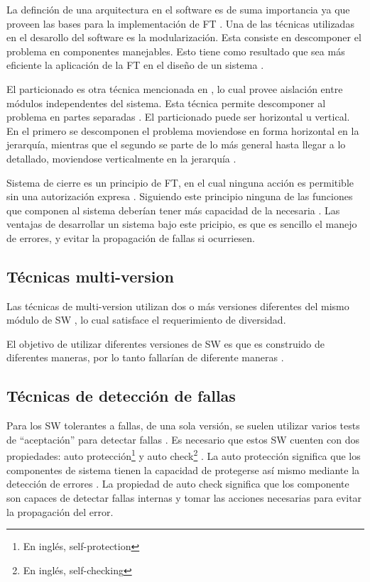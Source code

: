 La definción de una arquitectura en el software es de suma importancia ya que proveen las bases para 
la implementación de \ac{FT} \citep{SoftwareFaultToleranceATutorial}. Una de las técnicas utilizadas 
en el desarollo del software es la modularización. Esta consiste en descomponer el problema en 
componentes manejables. Esto tiene como resultado que sea más eficiente la aplicación de la \ac{FT} 
en el diseño de un sistema \citep{SoftwareFaultToleranceATutorial}. 

El particionado es otra técnica mencionada en \cite{SoftwareFaultToleranceATutorial}, lo cual 
provee aislación entre módulos independentes del sistema. Esta técnica permite descomponer al 
problema en partes separadas \citep{pressman01}. El particionado puede ser horizontal u 
vertical. En el primero se descomponen el problema moviendose en forma horizontal en la jerarquía, 
mientras que el segundo se parte de lo más general hasta llegar a lo detallado, moviendose 
verticalmente en la jerarquía \citep{pressman01}. 

Sistema de cierre es un principio de \ac{FT}, en el cual ninguna acción es permitible sin una 
autorización expresa \citep{SoftwareFaultToleranceATutorial}. Siguiendo este principio ninguna de 
las funciones que componen al sistema deberían tener más capacidad de la necesaria 
\citep{SoftwareFaultToleranceATutorial}. Las ventajas de desarrollar un sistema bajo este pricipio, 
es que es sencillo el manejo de errores, y evitar la propagación de fallas si ocurriesen. 

\subsection{Técnicas multi-version}
Las técnicas de multi-version utilizan dos o más versiones diferentes del mismo módulo de \ac{SW} 
\citep{FTDesign} \citep{SoftwareFaultToleranceATutorial}, lo cual satisface el requerimiento de 
diversidad. 

El objetivo de utilizar diferentes versiones de \ac{SW} es que es construido de diferentes 
maneras, por lo tanto fallarían de diferente maneras \citep{SoftwareFaultToleranceATutorial}.

\subsection{Técnicas de detección de fallas}
Para los \ac{SW} tolerantes a fallas, de una sola versión, se suelen utilizar varios tests de 
``aceptación'' para detectar fallas \citep{FTDesign}. Es necesario que estos \ac{SW} cuenten con 
dos propiedades: auto protección\footnote{En inglés, self-protection} y auto check\footnote{En 
inglés, self-checking} \citep{SoftwareFaultToleranceATutorial}. La auto protección significa que  
los componentes de sistema tienen la capacidad de protegerse así mismo mediante la detección de 
errores \citep{SoftwareFaultToleranceATutorial}. La propiedad de auto check significa que los 
componente son capaces de detectar fallas internas y tomar las acciones necesarias para evitar la 
propagación del error. 

